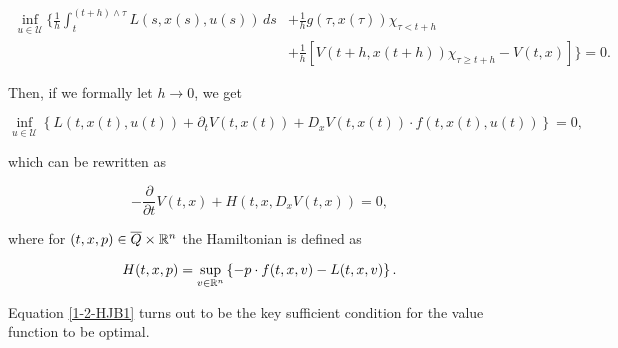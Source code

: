 \begin{equation}
    \begin{aligned}
        \inf_{u\in\mathcal{U}}\Bigg\{\frac{1}{h}\int_t^{(t+h)\land\tau} L(s,x(s),u(s))\,ds & + \frac{1}{h}g(\tau,x(\tau))\chi_{\tau<t+h} \\
        & + \frac{1}{h}\left[V(t+h,x(t+h))\chi_{\tau\geq t+h} - V(t,x)\right]\Bigg\}=0.    
    \end{aligned}
\end{equation}

Then, if we formally let $h\to0$, we get

\[\inf_{u\in\mathcal{U}}\left\{L(t,x(t),u(t)) + \partial_tV(t,x(t)) + D_xV(t,x(t))\cdot f(t,x(t),u(t))\right\}=0,\]

which can be rewritten as

\begin{equation}\label{1-2-HJB1}
    -\frac{\partial}{\partial t}V(t,x) + H(t,x,D_xV(t,x))=0,
\end{equation}

where for $(t,x,p)\in \overline{Q}\times\mathbb{R}^n$ the Hamiltonian is defined as

\begin{equation}\label{1-2-Hamiltonian1}
    H(t,x,p) = \sup_{v\in\mathbb{R}^n}\left\{-p\cdot f(t,x,v) - L(t,x,v)\right\}.
\end{equation}

Equation \eqref{1-2-HJB1} turns out to be the key sufficient condition for the value function to be optimal.

